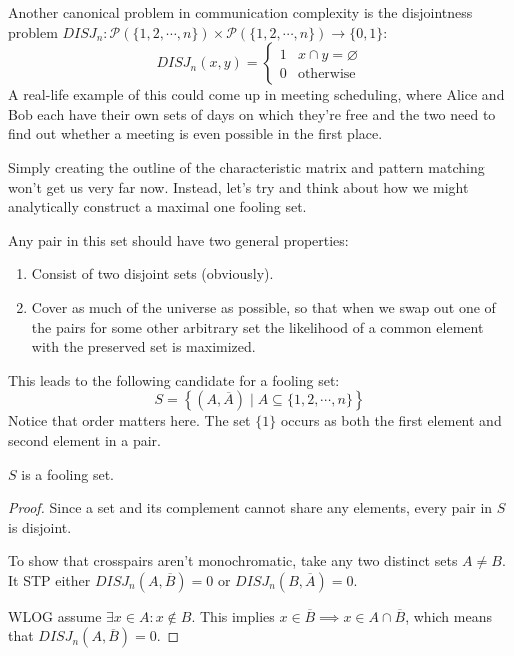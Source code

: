 \documentclass[letterpaper]{article}
\begin{document}
\begin{example}
    Another canonical problem in communication complexity is the disjointness problem
    $DISJ_n: \mathcal{P}(\{1, 2, \cdots, n\}) \times \mathcal{P}(\{1, 2, \cdots, n\}) \to \{0, 1\}$:
    \[DISJ_n(x, y)=\begin{cases}
            1 & x \cap y = \varnothing \\
            0 & \text{otherwise}
        \end{cases}\]
    A real-life example of this could come up in meeting scheduling, where
    Alice and Bob each have their own sets of days on which they're free
    and the two need to find out whether a meeting is even possible in the first place.

    Simply creating the outline of the characteristic matrix and pattern matching
    won't get us very far now.
    Instead, let's try and think about how we might analytically construct
    a maximal one fooling set.

    Any pair in this set should have two general properties:
    \begin{enumerate}
        \item Consist of two disjoint sets (obviously).
        \item Cover as much of the universe as possible, so that
              when we swap out one of the pairs for some other arbitrary set
              the likelihood of a common element with the preserved set is maximized.
    \end{enumerate}

    This leads to the following candidate for a fooling set:
    \[S=\left\{\left(A, \overline{A}\right) \mid A \subseteq \{1, 2, \cdots, n\}\right\}\]
    Notice that order matters here.
    The set $\{1\}$ occurs as both the first element and second element in a pair.
    \begin{claim}
        $S$ is a fooling set.
    \end{claim}
    \begin{proof}
        Since a set and its complement cannot share any elements, every pair in $S$ is disjoint.

        To show that crosspairs aren't monochromatic, take any two distinct sets $A \ne B$.
        It STP either $DISJ_n(A, \overline{B})=0$ or $DISJ_n(B, \overline{A})=0$.

        WLOG assume $\exists x \in A: x \notin B$.
        This implies $x \in \overline{B} \implies x \in A \cap \overline{B}$,
        which means that $DISJ_n(A, \overline{B})=0$.
    \end{proof}
\end{example}
\end{document}
